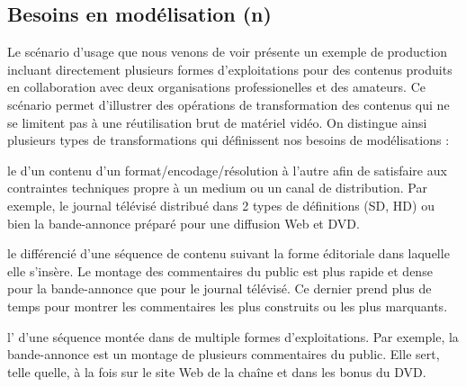

\subsection{Besoins en modélisation (n)}\label{sec:bm-av}
Le scénario d'usage que nous venons de voir présente un exemple de production incluant directement plusieurs formes d'exploitations pour des contenus produits en collaboration avec deux organisations professionelles et des amateurs. 
Ce scénario permet d'illustrer des opérations de transformation des contenus qui ne se limitent pas à une réutilisation brut de matériel vidéo. 
On distingue ainsi plusieurs types de transformations qui définissent nos besoins de modélisations :
\begin{liste}
	\item le  d'un contenu d'un format/encodage/résolution à l'autre afin de satisfaire aux contraintes techniques propre à un medium ou un canal de distribution. 
	Par exemple, le journal télévisé distribué dans 2 types de définitions (SD, HD) ou bien la bande-annonce préparé pour une diffusion Web et DVD.

	\item le  différencié d'une séquence de contenu suivant la forme éditoriale dans laquelle elle s'insère.
	Le montage des commentaires du public est plus rapide et dense pour la bande-annonce que pour le journal télévisé. 
	Ce dernier prend plus de temps pour montrer les commentaires les plus construits ou les plus marquants.

	\item l' d'une séquence montée dans de multiple formes d'exploitations. 
	Par exemple, la bande-annonce est un montage de plusieurs commentaires du public. 
	Elle sert, telle quelle, à la fois sur le site Web de la chaîne et dans les bonus du DVD. 
\end{liste}

